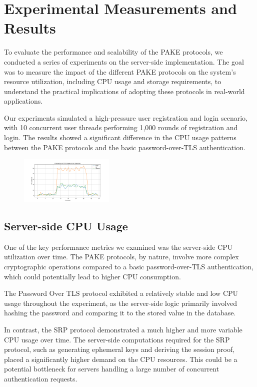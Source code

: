 \section{Experimental Measurements and Results}
\label{sec:exp_results}

To evaluate the performance and scalability of the PAKE protocols, we conducted a series of experiments on the server-side implementation. The goal was to measure the impact of the different PAKE protocols on the system's resource utilization, including CPU usage and storage requirements, to understand the practical implications of adopting these protocols in real-world applications.

Our experiments simulated a high-pressure user registration and login scenario, with 10 concurrent user threads performing 1,000 rounds of registration and login. The results showed a significant difference in the CPU usage patterns between the PAKE protocols and the basic password-over-TLS authentication.

\begin{figure}[ht]
  \centering
  \includegraphics[width=0.4\textwidth]{./images/cpu_usage_comparison.png}
  \label{fig:cpu_usage}
\end{figure}

\subsection{Server-side CPU Usage}

One of the key performance metrics we examined was the server-side CPU utilization over time. The PAKE protocols, by nature, involve more complex cryptographic operations compared to a basic password-over-TLS authentication, which could potentially lead to higher CPU consumption.

The Password Over TLS protocol exhibited a relatively stable and low CPU usage throughout the experiment, as the server-side logic primarily involved hashing the password and comparing it to the stored value in the database.

In contrast, the SRP protocol demonstrated a much higher and more variable CPU usage over time. The server-side computations required for the SRP protocol, such as generating ephemeral keys and deriving the session proof, placed a significantly higher demand on the CPU resources. This could be a potential bottleneck for servers handling a large number of concurrent authentication requests.

